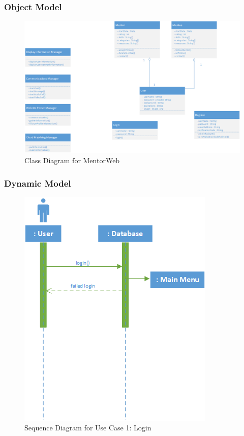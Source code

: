 \documentclass[11pt]{article}
\begin{document}
        \subsubsection{Object Model}
			\begin{figure}[H]
				\centering
				\includegraphics[angle=90,width=10 cm]{ClassDiagram}
				\caption{Class Diagram for MentorWeb}
				\label{ClassD}
			\end{figure}

        \subsubsection{Dynamic Model}

            \begin{figure}[H]
            \centering
            \includegraphics{SequenceUseCase1Login}
            \caption{Sequence Diagram for Use Case 1: Login}
            \label{SUC1}
            \end{figure}
\end{document}
